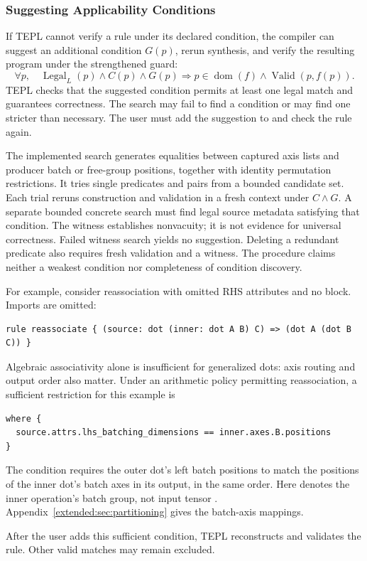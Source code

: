 \subsubsection{Suggesting Applicability Conditions}
\label{app:condition-suggestions}
If TEPL cannot verify a rule under its declared condition, the compiler
can suggest an additional condition $G(p)$, rerun synthesis, and verify
the resulting program under the strengthened guard:
\begin{equation}
 \forall p,\quad \operatorname{Legal}_L(p)\land C(p)\land G(p)
 \Rightarrow p\in\operatorname{dom}(f)\land\operatorname{Valid}(p,f(p)).
 \label{eq:suggested-condition}
\end{equation}
TEPL checks that the suggested condition permits at least one legal
match and guarantees correctness. The search may fail to find a
condition or may find one stricter than necessary. The user must add
the suggestion to  and check the rule again.

The implemented search generates equalities between captured axis lists
and producer batch or free-group positions, together with identity
permutation restrictions. It tries single predicates and pairs from a
bounded candidate set. Each trial reruns construction and validation in
a fresh context under $C\land G$. A separate bounded concrete search
must find legal source metadata satisfying that condition. The witness
establishes nonvacuity; it is not evidence for universal correctness.
Failed witness search yields no suggestion. Deleting a redundant predicate
also requires fresh validation and a witness. The procedure claims neither
a weakest condition nor completeness of condition discovery.

For example, consider reassociation with omitted RHS attributes and no
 block. Imports are omitted:
\begin{lstlisting}[language=TEPL]
rule reassociate { (source: dot (inner: dot A B) C) => (dot A (dot B C)) }
\end{lstlisting}
Algebraic associativity alone is insufficient for generalized dots:
axis routing and output order also matter. Under an arithmetic policy
permitting reassociation, a sufficient restriction for this example is
\begin{lstlisting}[language=TEPL]
where {
  source.attrs.lhs_batching_dimensions == inner.axes.B.positions
}
\end{lstlisting}
The condition requires the outer dot's left batch positions to match
the positions of the inner dot's batch axes in its output, in the same
order. Here  denotes the inner operation's batch
group, not input tensor . Appendix~\ref{extended:sec:partitioning} gives the batch-axis mappings.

After the user adds this sufficient condition, TEPL reconstructs and
validates the rule. Other valid matches may remain excluded.
